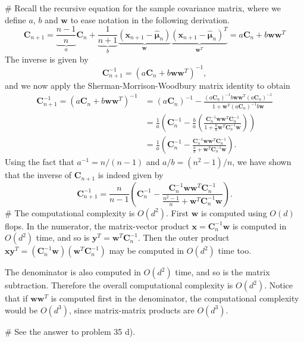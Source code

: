 \documentclass[12pt, a4paper]{article}
\newcommand{\vect}[1]{\bm{#1}}
\begin{document}
\begin{easylist}[enumerate]
# Recall the recursive equation for the sample covariance matrix, where we define $a$, $b$ and $\vect{w}$ to ease notation in the following derivation.
\begin{equation*}
	\vect{C}_{n+1} = \underbrace{\frac{n-1}{n}}_{a} \vect{C}_n + \underbrace{\frac{1}{n+1}}_b
	\underbrace{\left( \vect{x}_{n+1} - \hat{\vect{\mu}}_n \right)}_{\vect{w}}
	\underbrace{\left( \vect{x}_{n+1} - \hat{\vect{\mu}}_n \right)^T}_{\vect{w}^T}
	= a \vect{C}_n + b \vect{w} \vect{w}^T
\end{equation*}
The inverse is given by
\begin{equation*}
	\vect{C}_{n+1}^{-1} = \left( a \vect{C}_n + b \vect{w} \vect{w}^T \right)^{-1},
\end{equation*}
and we now apply the Sherman-Morrison-Woodbury matrix identity to obtain
\begin{align*}
	\vect{C}_{n+1}^{-1} = \left( a \vect{C}_n + b \vect{w} \vect{w}^T \right)^{-1} & = \left( a \vect{C}_n \right)^{-1} - \frac{\left( a \vect{C}_n \right)^{-1} b \vect{w} \vect{w}^T \left( a \vect{C}_n \right)^{-1}}{1 + \vect{w}^T \left( a \vect{C}_n \right)^{-1} b \vect{w}} \\
	&= \frac{1}{a}\left( \vect{C}_n^{-1} - \frac{b}{a} \left( \frac{ \vect{C}_n^{-1} \vect{w} \vect{w}^T \vect{C}_n^{-1}}{1 + \frac{b}{a} \vect{w}^T \vect{C}_n^{-1} \vect{w}} \right) \right) \\
	&= \frac{1}{a}\left( \vect{C}_n^{-1} - 
	\frac{ \vect{C}_n^{-1} \vect{w} \vect{w}^T \vect{C}_n^{-1}}{\frac{a}{b} + \vect{w}^T \vect{C}_n^{-1} \vect{w}}  \right).
\end{align*}
Using the fact that $a^{-1} = n / (n-1)$ and $a /b = (n^2 - 1) / n$, we have shown that the inverse of $\vect{C}_{n+1}$ is indeed given by
\begin{equation*}
	\vect{C}_{n+1}^{-1} =
	\frac{n}{n-1}\left( \vect{C}_n^{-1} - 
	\frac{ \vect{C}_n^{-1} \vect{w} \vect{w}^T \vect{C}_n^{-1}}{\frac{n^2-1}{n} + \vect{w}^T \vect{C}_n^{-1} \vect{w}}  \right).
\end{equation*}
# The computational complexity is $O(d^2)$.
First $\vect{w}$ is computed using $O(d)$ flops.
In the numerator, the matrix-vector product $\vect{x} = \vect{C}_n^{-1} \vect{w}$ is computed in $O(d^2)$ time, and so is $\vect{y}^T = \vect{w}^T \vect{C}_n^{-1}$.
Then the outer product $\vect{x}\vect{y}^T =  \left( \vect{C}_n^{-1} \vect{w} \right) \left( \vect{w}^T \vect{C}_n^{-1} \right)$ may be computed in $O(d^2)$ time too.

The denominator is also computed in $O(d^2)$ time, and so is the matrix subtraction.
Therefore the overall computational complexity is $O(d^2)$.
Notice that if $\vect{w} \vect{w}^T$ is computed first in the denominator, the computational complexity would be $O(d^3)$, since matrix-matrix products are $O(d^3)$.

# See the answer to problem 35 d).
\end{easylist}
\end{document}
